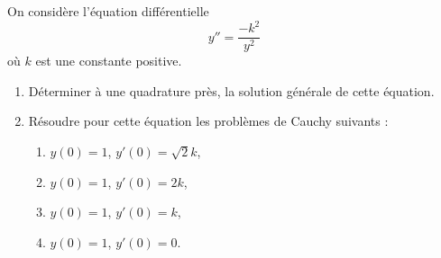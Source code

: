 

\begin{exercice}\label{exo_II-1-15}
 
On considère l'équation différentielle
\begin{equation}
	y''=\frac{ -k^2 }{ y^2 }
\end{equation}
où $k$ est une constante positive.

\begin{enumerate}
\item Déterminer à une quadrature près, la solution générale de cette équation.
\item Résoudre pour cette équation les problèmes de Cauchy suivants :
\begin{enumerate}
\item $y(0)=1$, $y'(0)=\sqrt{2}k$,
\item $y(0)=1$, $y'(0)=2k$,
\item $y(0)=1$, $y'(0)=k$,
\item $y(0)=1$, $y'(0)=0$.
\end{enumerate}
\end{enumerate}


\end{exercice}
